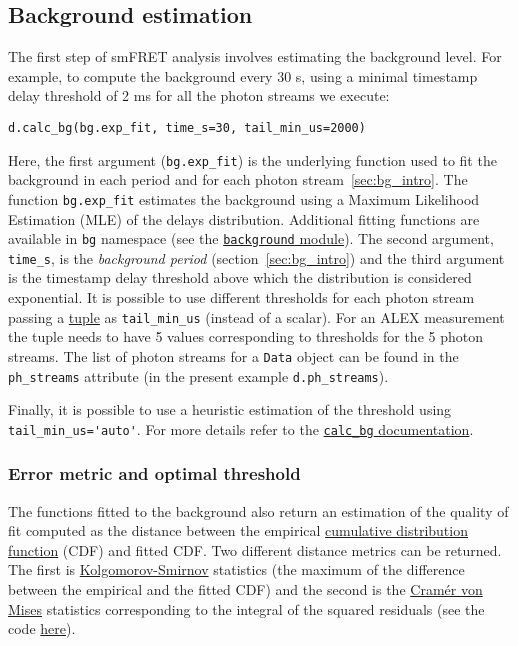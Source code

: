 \subsection{Background estimation}
\label{sec:bg_calc}

The first step of smFRET analysis involves estimating the background level. 
For example, to compute the background every 30 s, using a minimal timestamp 
delay threshold of 2 ms for all the photon streams we execute: 

\begin{verbatim}
d.calc_bg(bg.exp_fit, time_s=30, tail_min_us=2000)
\end{verbatim}

Here, the first argument (\verb|bg.exp_fit|) is the underlying function used to fit the
background in each period and for each photon stream~\ref{sec:bg_intro}. The function 
\verb|bg.exp_fit| estimates the background using a Maximum Likelihood Estimation 
(MLE) of the delays distribution. Additional fitting functions are available in 
\verb|bg| namespace (see the 
\href{http://fretbursts.readthedocs.org/en/latest/background.html}
{\texttt{background} module}). The second argument, \verb|time_s|, is the 
\textit{background period} (section~\ref{sec:bg_intro}) and the third argument 
is the timestamp delay threshold above which the distribution is considered exponential. 
It is possible to use different thresholds 
for each photon stream passing a 
\href{https://docs.python.org/2/tutorial/datastructures.html#tuples-and-sequences}{tuple} 
as \verb|tail_min_us| (instead of a scalar). 
For an ALEX measurement the tuple needs to have 5 values 
corresponding to thresholds for the 5 photon streams. The list of photon 
streams for a \verb|Data| object can be found in the \verb|ph_streams| 
attribute (in the present example \verb|d.ph_streams|). 

Finally, it is possible to use a heuristic estimation of the threshold using 
\verb|tail_min_us='auto'|. For more details refer to the 
\href{http://fretbursts.readthedocs.org/en/latest/data\_class.html#fretbursts.burstlib.Data.calc\_bg}{\texttt{calc\_bg} documentation}.

\subsubsection{Error metric and optimal threshold}

The functions fitted to the background also return an estimation of the 
quality of fit computed as the distance between the empirical 
\href{http://en.wikipedia.org/wiki/Cumulative\_distribution\_function}{cumulative distribution function} 
(CDF) and fitted CDF. Two different distance metrics can be returned. 
The first is  
\href{http://en.wikipedia.org/wiki/Kolmogorov\%E2\%80\%93Smirnov\_test}{Kolgomorov-Smirnov} 
statistics (the maximum of the difference between the empirical and the 
fitted CDF) and the second is the 
\href{http://en.wikipedia.org/wiki/Cram\%C3\%A9r\%E2\%80\%93von\_Mises\_criterion}{Cramér von Mises}
statistics corresponding to the integral of the squared residuals 
(see the code 
\href{https://github.com/tritemio/FRETBursts/blob/master/fretbursts/background.py#L41}{here}).


